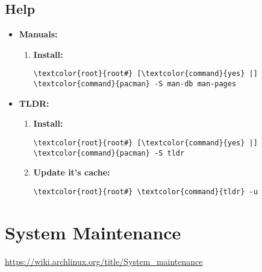 \documentclass[10pt, a4paper, onecolumn, openany]{book} %
\begin{document}
\section{Help}
\begin{itemize}
    \item \textbf{Manuals:}
    \begin{enumerate}
        \item \textbf{Install:}
\begin{Verbatim}[commandchars=\\\{\}]
\textcolor{root}{root#} [\textcolor{command}{yes} |] \textcolor{command}{pacman} -S man-db man-pages
\end{Verbatim}
    \end{enumerate}

    \item \textbf{TLDR:}
    \begin{enumerate}
        \item \textbf{Install:}
\begin{Verbatim}[commandchars=\\\{\}]
\textcolor{root}{root#} [\textcolor{command}{yes} |] \textcolor{command}{pacman} -S tldr
\end{Verbatim}
        \item \textbf{Update it's cache:}
\begin{Verbatim}[commandchars=\\\{\}]
\textcolor{root}{root#} \textcolor{command}{tldr} -u
\end{Verbatim}
    \end{enumerate}

\end{itemize}

\chapter{System Maintenance}
\underline{\href{https://wiki.archlinux.org/title/System\_maintenance}{https://wiki.archlinux.org/title/System\_maintenance}}


\end{document}
